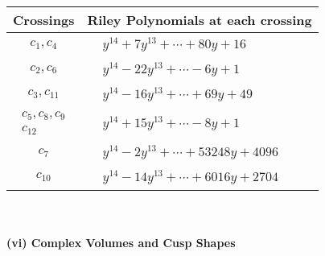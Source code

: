 \documentclass[1p]{elsarticle_modified}
\theoremstyle{definition}
\begin{document}
\begin{tabular}{m{50pt}|m{274pt}}
Crossings & \hspace{64pt}Riley Polynomials at each crossing \\
\hline $$\begin{aligned}c_{1},c_{4}\end{aligned}$$&$\begin{aligned}
&y^{14}+7 y^{13}+\cdots+80 y+16
\end{aligned}$\\
\hline $$\begin{aligned}c_{2},c_{6}\end{aligned}$$&$\begin{aligned}
&y^{14}-22 y^{13}+\cdots-6 y+1
\end{aligned}$\\
\hline $$\begin{aligned}c_{3},c_{11}\end{aligned}$$&$\begin{aligned}
&y^{14}-16 y^{13}+\cdots+69 y+49
\end{aligned}$\\
\hline $$\begin{aligned}c_{5},c_{8},c_{9}\\c_{12}\end{aligned}$$&$\begin{aligned}
&y^{14}+15 y^{13}+\cdots-8 y+1
\end{aligned}$\\
\hline $$\begin{aligned}c_{7}\end{aligned}$$&$\begin{aligned}
&y^{14}-2 y^{13}+\cdots+53248 y+4096
\end{aligned}$\\
\hline $$\begin{aligned}c_{10}\end{aligned}$$&$\begin{aligned}
&y^{14}-14 y^{13}+\cdots+6016 y+2704
\end{aligned}$\\
\hline
\end{tabular}\\~\\
\newpage\flushleft \textbf{(vi) Complex Volumes and Cusp Shapes}
\end{document}
